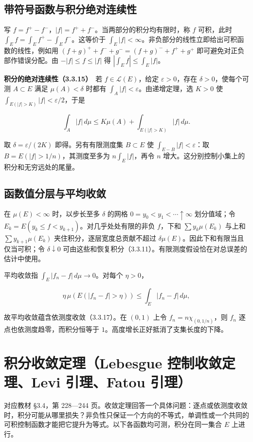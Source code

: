 \documentclass[11pt,a4paper]{article}
\begin{document}
\subsection*{带符号函数与积分绝对连续性}\label{ux5e26ux7b26ux53f7ux51fdux6570ux4e0eux79efux5206ux7eddux5bf9ux8fdeux7eedux6027}

写 \(f=f^+-f^-\)，\(|f|=f^++f^-\)。当两部分的积分均有限时，称 \(f\) 可积，此时 \(\int_E f=\int_E f^+-\int_E f^-\)。这等价于 \(\int_E|f|<\infty\)。非负部分的线性立即给出可积函数的线性，例如用 \((f+g)^++f^-+g^-=(f+g)^-+f^++g^+\) 即可避免对正负部作错误分配。由 \(-|f|\le f\le|f|\) 得 \(|\int_E f|\le\int_E|f|\)。

\textbf{积分的绝对连续性（3.3.15）}　若 \(f\in\mathcal L(E)\)，给定 \(\varepsilon>0\)，存在 \(\delta>0\)，使每个可测 \(A\subset E\) 满足 \(\mu(A)<\delta\) 时都有 \(\int_A|f|<\varepsilon\)。由递增定理，选 \(K>0\) 使 \(\int_{E(|f|>K)}|f|<\varepsilon/2\)，于是

\[
\int_A |f|\,d\mu\le K\mu(A)+\int_{E(|f|>K)}|f|\,d\mu.
\]

取 \(\delta=\varepsilon/(2K)\) 即得。另有有限测度集 \(B\subset E\) 使 \(\int_{E-B}|f|<\varepsilon\)：取 \(B=E(|f|>1/n)\)，其测度至多为 \(n\int_E|f|\)，再令 \(n\) 增大。这分别控制小集上的积分和无穷远处的尾量。

\subsection*{函数值分层与平均收敛}\label{ux51fdux6570ux503cux5206ux5c42ux4e0eux5e73ux5747ux6536ux655b}

在 \(\mu(E)<\infty\) 时，以步长至多 \(\delta\) 的网格 \(0=y_0<y_1<\cdots\uparrow\infty\) 划分值域；令 \(E_k=E(y_k\le f<y_{k+1})\)。对几乎处处有限的非负 \(f\)，下和 \(\sum y_k\mu(E_k)\) 与上和 \(\sum y_{k+1}\mu(E_k)\) 夹住积分，逐层宽度总贡献不超过 \(\delta\mu(E)\)。因此下和有限当且仅当可积；令 \(\delta\downarrow0\) 可由这些和恢复积分（3.3.11）。有限测度假设恰在对总误差的估计中使用。

平均收敛指 \(\int_E|f_n-f|\,d\mu\to0\)。对每个 \(\eta>0\)，

\[
\eta\,\mu(E(|f_n-f|>\eta))\le\int_E|f_n-f|\,d\mu,
\]

故平均收敛蕴含依测度收敛（3.3.17）。在 \((0,1)\) 上令 \(f_n=n\chi_{(0,1/n)}\)，则 \(f_n\) 逐点也依测度趋零，而积分恒等于 \(1\)。高度增长正好抵消了支集长度的下降。

\section{积分收敛定理（Lebesgue 控制收敛定理、Levi 引理、Fatou 引理）}
对应教材 §3.4，第 228---244 页。收敛定理回答一个具体问题：逐点或依测度收敛时，积分可能从哪里损失？非负性只保证一个方向的不等式，单调性或一个共同的可积控制函数才能把它提升为等式。以下各函数均可测，积分在同一集合 \(E\) 上进行。
\end{document}
